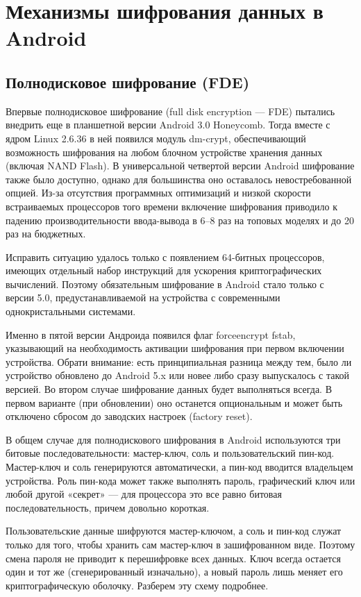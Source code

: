 \section{Механизмы шифрования данных в Android}

\subsection*{Полнодисковое шифрование (FDE)}

Впервые полнодисковое шифрование (full disk encryption — FDE) пытались внедрить
еще в планшетной версии Android 3.0 Honeycomb. Тогда вместе с ядром Linux
2.6.36 в ней появился модуль dm-crypt, обеспечивающий возможность шифрования на
любом блочном устройстве хранения данных (включая NAND Flash). В универсальной
четвертой версии Android шифрование также было доступно, однако для большинства
оно оставалось невостребованной опцией. Из-за отсутствия программных
оптимизаций и низкой скорости встраиваемых процессоров того времени включение
шифрования приводило к падению производительности ввода-вывода в 6–8 раз на
топовых моделях и до 20 раз на бюджетных.

Исправить ситуацию удалось только с появлением 64-битных процессоров, имеющих
отдельный набор инструкций для ускорения криптографических вычислений. Поэтому
обязательным шифрование в Android стало только с версии 5.0,
предустанавливаемой на устройства с современными однокристальными системами.

Именно в пятой версии Андроида появился флаг forceencrypt fstab, указывающий на
необходимость активации шифрования при первом включении устройства. Обрати
внимание: есть принципиальная разница между тем, было ли устройство обновлено
до Android 5.x или новее либо сразу выпускалось с такой версией. Во втором
случае шифрование данных будет выполняться всегда. В первом варианте (при
обновлении) оно останется опциональным и может быть отключено сбросом до
заводских настроек (factory reset).

В общем случае для полнодискового шифрования в Android используются три битовые
последовательности: мастер-ключ, соль и пользовательский пин-код. Мастер-ключ и
соль генерируются автоматически, а пин-код вводится владельцем устройства. Роль
пин-кода может также выполнять пароль, графический ключ или любой другой
«секрет» — для процессора это все равно битовая последовательность, причем
довольно короткая.

Пользовательские данные шифруются мастер-ключом, а соль и пин-код служат только
для того, чтобы хранить сам мастер-ключ в зашифрованном виде. Поэтому смена
пароля не приводит к перешифровке всех данных. Ключ всегда остается один и тот
же (сгенерированный изначально), а новый пароль лишь меняет его
криптографическую оболочку. Разберем эту схему подробнее.

